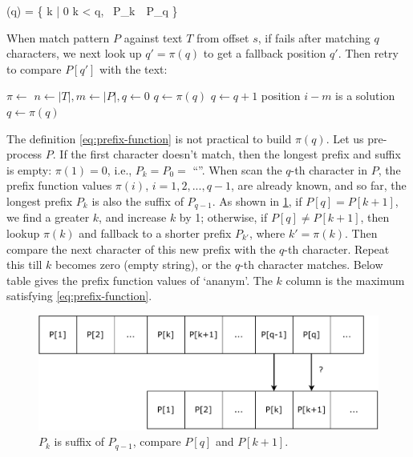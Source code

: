 \documentclass[b5paper]{article}
\begin{document}
\be
\pi(q) = \max \{ k | 0 \leq k < q, \ P_k\ \ P_q \}
\label{eq:prefix-function}
\ee

When match pattern $P$ against text $T$ from offset $s$, if fails after matching $q$ characters, we next look up $q' = \pi(q)$ to get a fallback position $q'$. Then retry to compare $P[q']$ with the text:

\begin{algorithmic}[1]
  \State $\pi \gets $ 
  \State $n \gets |T|, m \gets |P|, q \gets 0$
      \State $q \gets \pi(q)$
    \EndWhile
      \State $q \gets q + 1$
    \EndIf
      \State position $i - m$ is a solution
      \State $q \gets \pi(q)$ 
    \EndIf
  \EndFor
\EndFunction
\end{algorithmic}

The definition \cref{eq:prefix-function} is not practical to build $\pi(q)$. Let us pre-process $P$. If the first character doesn't match, then the longest prefix and suffix is empty: $\pi(1) = 0$, i.e., $P_k = P_0 = $ ``''. When scan the $q$-th character in $P$, the prefix function values $\pi(i)$, $i = 1, 2, ..., q-1$, are already known, and so far, the longest prefix $P_k$ is also the suffix of $P_{q-1}$. As shown in \cref{fig:kmp-prefix-func}, if $P[q] = P[k+1]$, we find a greater $k$, and increase $k$ by 1; otherwise, if $P[q] \neq P[k + 1]$, then lookup $\pi(k)$ and fallback to a shorter prefix $P_{k'}$, where $k' = \pi(k)$. Then compare the next character of this new prefix with the $q$-th character. Repeat this till $k$ becomes zero (empty string), or the $q$-th character matches. Below table gives the prefix function values of `ananym'. The $k$ column is the maximum satisfying \cref{eq:prefix-function}.

\begin{figure}[htbp]
 \centering
 \includegraphics[scale=0.5]{img/kmp-prefix-func}
 \caption{$P_k$ is suffix of $P_{q-1}$, compare $P[q]$ and $P[k+1]$.}
 \label{fig:kmp-prefix-func}
\end{figure}
\end{document}
